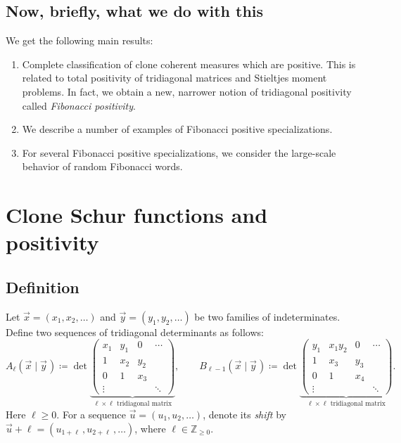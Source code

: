 \documentclass[letterpaper,11pt,oneside,reqno]{article}
\numberwithin{equation}{section}
\newcommand{\ssp}{\hspace{1pt}}
\theoremstyle{definition}
\begin{document}
\subsection{Now, briefly, what we do with this}

We get the following main results:
\begin{enumerate}
	\item Complete classification of 
		clone coherent measures which are positive. 
		This is related to total positivity of tridiagonal matrices and Stieltjes moment
		problems.
		In fact, we obtain a new, narrower notion of tridiagonal
		positivity called \emph{Fibonacci positivity}. 
	\item We describe a number of examples of Fibonacci positive specializations.
	\item For several Fibonacci positive specializations, we consider the large-scale behavior of random Fibonacci words.
\end{enumerate}

\section{Clone Schur functions and positivity}

\subsection{Definition}

Let $\vec x=(x_1,x_2,\ldots )$ and $\vec y=(y_1,y_2,\ldots)$ be two families of indeterminates.
Define two sequences of tridiagonal determinants as follows:
\begin{equation}
	\label{eq:A_B_dets}
	A_\ell (\vec{x} \mid \vec{y}\ssp) \coloneqq
	\det
	\underbrace{\begin{pmatrix}
	x_1 & y_1 & 0 & \cdots\\
	1 & x_2 & y_2 &\\
	0 & 1 & x_3  & \\
	\vdots & & & \ddots
	\end{pmatrix}}_{\text{$\ell \times \ell $ tridiagonal matrix}} ,
	\qquad
	B_{\ell -1} (\vec{x} \mid \vec{y}\ssp) \coloneqq
	\det
	\underbrace{\begin{pmatrix}
	y_1 & x_1y_2 & 0 & \cdots\\
	1 & x_3 & y_3 &\\
	0 & 1 & x_4 & \\
	\vdots & & & \ddots
	\end{pmatrix}}_{\text{$\ell \times \ell$ tridiagonal matrix}} .
\end{equation}
Here $\ell\ge0$.
For a sequence $\vec u=(u_1,u_2,\ldots)$,
denote its
\emph{shift} by $\vec u+ \ell = (u_{1+\ell} \, ,u_{2+\ell} \, ,\ldots)$, where $\ell\in \mathbb{Z}_{\ge0}$.
\end{document}
